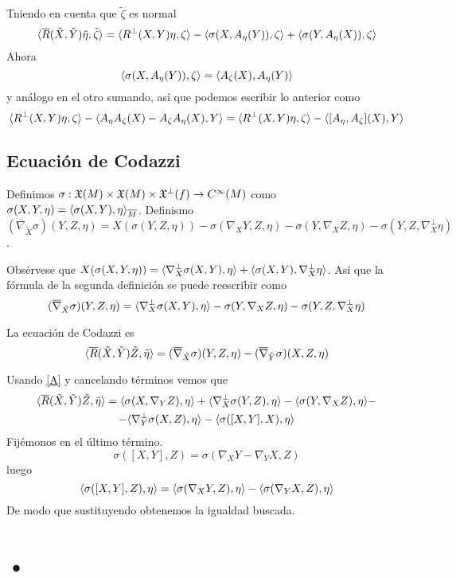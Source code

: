 \documentclass[GSR.tex]{subfiles}
\begin{document}
Tniendo en cuenta que $\tilde{\zeta}$ es normal
\[
\langle{\overline{R}(\tilde{X},\tilde{Y})\tilde{\eta},\tilde{\zeta}}\rangle=\langle{R^\perp(X,Y)\eta,\zeta}\rangle-\langle{\sigma(X,A_\eta(Y)),\zeta}\rangle+\langle{\sigma(Y,A_\eta(X)),\zeta}\rangle
\]
Ahora
\[
\langle{\sigma(X,A_\eta(Y)),\zeta}\rangle=\langle{A_\zeta(X),A_\eta(Y)}\rangle
\]
y análogo en el otro sumando, así que podemos escribir lo anterior como
\[
\langle{R^\perp(X,Y)\eta,\zeta}\rangle-\langle{A_\eta A_\zeta(X)-A_\zeta A_\eta(X),Y}\rangle=\langle{R^\perp(X,Y)\eta,\zeta}\rangle-\langle{[A_\eta,A_\zeta](X),Y}\rangle
\]

\subsection{Ecuación de Codazzi}
Definimos $\sigma:{\mathfrak{X}}(M)\times{\mathfrak{X}}(M)\times{\mathfrak{X}}^\perp(f)\to C^\infty(M)$ como $\sigma(X,Y,\eta)=\langle{\sigma(X,Y),\eta}\rangle_{\overline{M}}$. Definismo $(\overline{\nabla}_{\tilde{X}}\sigma)(Y,Z,\eta)=X(\sigma(Y,Z,\eta))-\sigma(\nabla_XY,Z,\eta)-\sigma(Y,\nabla_XZ,\eta)-\sigma(Y,Z,\nabla_X^\perp\eta)$. 

Obsérvese que $X(\sigma(X,Y,\eta))=\langle{\nabla_X^\perp \sigma(X,Y),\eta}\rangle+\langle{\sigma(X,Y),\nabla_X^\perp\eta}\rangle$. Así que la fórmula de la segunda definición se puede reescribir como 
\[
(\overline{\nabla}_{\tilde{X}}\sigma)(Y,Z,\eta)=\langle{\nabla_X^\perp \sigma(X,Y),\eta}\rangle-\sigma(Y,\nabla_XZ,\eta)-\sigma(Y,Z,\nabla_X^\perp\eta)
\]

La ecuación de Codazzi es
\[
\langle{\overline{R}(\tilde{X},\tilde{Y})\tilde{Z},\tilde{\eta}}\rangle=(\overline{\nabla}_{\tilde{X}}\sigma)(Y,Z,\eta)-(\overline{\nabla}_{\tilde{Y}}\sigma)(X,Z,\eta)
\]

Usando \ref{A} y cancelando términos vemos que
\begin{gather*}
\langle{\overline{R}(\tilde{X},\tilde{Y})\tilde{Z},\tilde{\eta}}\rangle=\langle{\sigma(X,\nabla_YZ),\eta}\rangle+\langle{\nabla_X^\perp\sigma(Y,Z),\eta}\rangle-\langle{\sigma(Y,\nabla_XZ),\eta}\rangle-\\
-\langle{\nabla_Y^\perp\sigma(X,Z),\eta}\rangle-\langle{\sigma([X,Y],X),\eta}\rangle
\end{gather*}
Fijémonos en el último término. 
\[
\sigma([X,Y],Z)=\sigma(\nabla_XY-\nabla_YX,Z)
\]
luego
\[
\langle{\sigma([X,Y],Z),\eta}\rangle=\langle{\sigma(\nabla_XY,Z),\eta}\rangle-\langle{\sigma(\nabla_YX,Z),\eta}\rangle
\]
De modo que sustituyendo obtenemos la igualdad buscada. 

\section{•}
\end{document}
